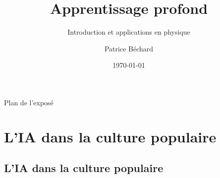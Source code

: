 \documentclass[french]{beamer}
\author{Patrice Béchard}
\institute[DIRO]{\small{Département d'informatique et de recherche opérationnelle}}
\title{Apprentissage profond}
\subtitle{Introduction et applications en physique}
\date{\today}
\begin{document}
\begin{frame}[plain, t]
  \titlepage
\end{frame}


\begin{frame}{Plan de l'exposé}
  \tableofcontents
\end{frame}



\section{L'IA dans la culture populaire}
\subsection*{L'IA dans la culture populaire}
\end{document}
